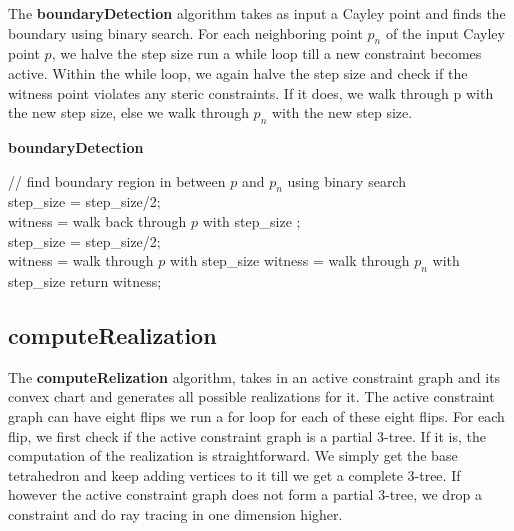 The \textbf{boundaryDetection} algorithm takes as input a Cayley point and finds the boundary using binary search. For each neighboring point $p_n$ of the input Cayley point $p$, we halve the step size run a while loop till a new constraint becomes active. Within the while loop, we again halve the step size and check if the witness point violates any steric constraints. If it does, we walk through p with the new step size, else we walk through $p_n$ with the new step size.


\begin{algorithm} [htbp]
 {\bf boundaryDetection}\\
 \BlankLine

	{
		{
			// find boundary region in between $p$ and $p_n$ using binary search \\

			step\_size = step\_size/2;\\
			witness = walk back through $p$ with step\_size ;\\

			{
				step\_size = step\_size/2; 	\\
				{	witness = walk through $p$ with step\_size }
				{	witness = walk through $p_n$ with step\_size }
			}
		}
	}
	return witness;\\

\caption{ boundaryDetection
\label{alg:boundaryDetection}}
\end{algorithm}


\subsection{computeRealization}

The \textbf{computeRelization} algorithm, takes in an active constraint graph and its convex chart and generates all possible realizations for it. The active constraint graph can have eight flips we run a for loop for each of these eight flips. For each flip, we first check if the active constraint graph is a partial 3-tree. If it is, the computation of the realization is straightforward. We simply get the base tetrahedron and keep adding vertices to it till we get a complete 3-tree. If however the active constraint graph does not form a partial 3-tree, we drop a constraint and do ray tracing in one dimension higher.

